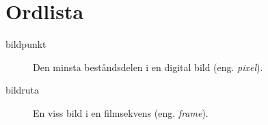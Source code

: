 \documentclass[rapport_MVEX01-11-05]{subfiles}
\begin{document}
\section*{Ordlista}
\begin{description}
    \item[bildpunkt] Den minsta beståndsdelen i en digital bild (eng.
        \emph{pixel}).
    \item[bildruta] En viss bild i en filmsekvens (eng. \emph{frame}).
\end{description}
\end{document}
